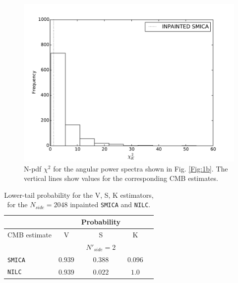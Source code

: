 \begin{figure}
\centering
\includegraphics[width=\textwidth]{figures/chapter-vsk/kchi2.pdf}
\caption{N-pdf $\chi^ 2$ for the angular power spectra shown in Fig. \ref{Fig:1b}. The vertical lines show values for the corresponding CMB estimates.}
\label{Fig:2b}
\end{figure}

\begin{table}
\centering
\caption{Lower-tail probability for the V, S, K estimators, for the $N_{side} = 2048$ inpainted \texttt{SMICA} and \texttt{NILC}.}
\label{table:1}
\begin{tabular}{@{}lcccc}
\hline 
  & & Probability & \\
\hline  
CMB estimate & V & S & K \\ 
\hline  
 & & $N'_{side}=2$ & \\
\texttt{SMICA} & $0.939$ & $0.388$ & $0.096$ \\ 
\texttt{NILC} & $0.939$ & $0.022$ & $1.0$  \\
\hline
\end{tabular} 
\end{table}


